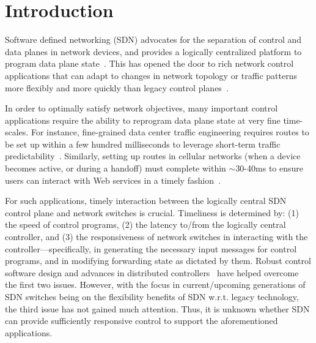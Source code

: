 \section{Introduction}\label{sec-intro}

Software defined networking (SDN) advocates for the separation of control and
data planes in network devices, and provides a logically centralized platform
to program data plane state~\cite{openflow,rethinking}.  This has opened the
door to rich network control applications that can adapt to changes in
network topology or traffic patterns more flexibly and more quickly than 
legacy control
planes~\cite{swan,b4,ananta,simple,elastictree,softcell,zupdate,microte}.



In order to optimally satisfy network objectives, many important control 
applications require the ability to reprogram data plane state at very fine 
time-scales. For instance, fine-grained data center
traffic engineering requires routes to be set up within a few hundred
milliseconds to leverage short-term traffic
predictability~\cite{microte}. Similarly, setting up routes in
cellular networks (when a device becomes active, or during a handoff)
must complete within $\sim$30-40ms to ensure users can interact with
Web services in a timely fashion~\cite{softcell}.

For such applications, timely interaction between the logically
central SDN control plane and network switches is crucial. Timeliness
is determined by: (1) the speed of control programs, (2) the latency
to/from the logically central controller, and (3) the responsiveness
of network switches in interacting with the controller---specifically,
in generating the necessary input messages for control programs, and
in modifying forwarding state as dictated by them. Robust control
software design and advances in distributed controllers~\cite{onix}
have helped overcome the first two issues. However, with the focus in
current/upcoming generations of SDN switches being on the flexibility
benefits of SDN w.r.t. legacy technology, the third issue has
not gained much attention. Thus, it is unknown whether SDN can
provide sufficiently responsive control to support the aforementioned
applications.


